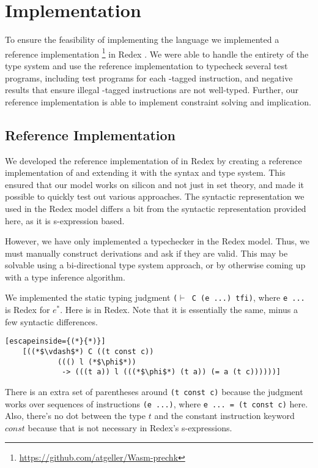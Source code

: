 \chapter{Implementation}
\label{chp:implementation}
To ensure the feasibility of implementing the \name language we implemented a reference implementation \footnote{\hyperlink{https://github.com/atgeller/Wasm-prechk}{https://github.com/atgeller/Wasm-prechk}} in Redex \cite{redex}.
We were able to handle the entirety of the type system and use the reference implementation to typecheck several test programs, including test programs for each \prechk-tagged instruction, and negative results that ensure illegal \prechk-tagged instructions are not well-typed.
Further, our reference implementation is able to implement constraint solving and implication.

\section{Reference Implementation}
We developed the reference implementation of \name in Redex by creating a reference implementation of \wasm and extending it with the \name syntax and type system.
This ensured that our model works on silicon and not just in set theory, and made it possible to quickly test out various approaches.
The syntactic representation we used in the Redex model differs a bit from the syntactic representation provided here, as it is s-expression based.

However, we have only implemented a typechecker in the Redex model.
Thus, we must manually construct derivations and ask if they are valid.
This may be solvable using a bi-directional type system approach, or by otherwise coming up with a type inference algorithm.

We implemented the static typing judgment \texttt{($\vdash$ C (e ...) tfi)}, where \texttt{e ...} is Redex for $e^{*}$.
Here is  in Redex.
Note that it is essentially the same, minus a few syntactic differences.

\begin{lstlisting}[escapeinside={(*}{*)}]
    [((*$\vdash$*) C ((t const c))
            ((() l (*$\phi$*))
             -> (((t a)) l (((*$\phi$*) (t a)) (= a (t c))))))]
\end{lstlisting}

There is an extra set of parentheses around \texttt{(t const c)} because the judgment works over sequences of instructions \texttt{(e ...)}, where \texttt{e ... = (t const c)} here.
Also, there's no dot between the type $t$ and the constant instruction keyword $const$ because that is not necessary in Redex's s-expressions.

